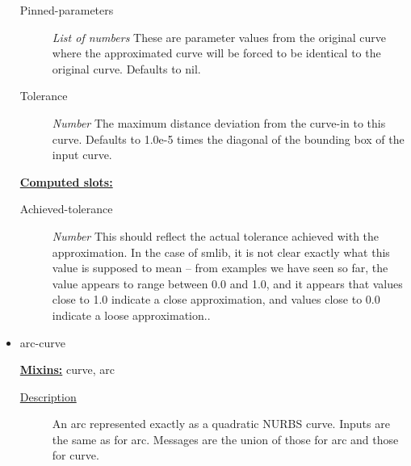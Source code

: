 \documentclass [11pt]{book}
\begin{document}
\begin{itemize}
\begin{description}
\item [Pinned-parameters]
\emph{List of numbers} These are parameter values from the original curve
where the approximated curve will be forced to be identical to the original
curve. Defaults to nil.


\item [Tolerance]
\emph{Number} The maximum distance deviation from the curve-in to this curve.
Defaults to 1.0e-5 times the diagonal of the bounding box of the input curve.


\end{description}






\textbf{
\underline{Computed slots:}}

\begin{description}

\item [Achieved-tolerance]
\emph{Number} This should reflect the actual tolerance achieved with the approximation.
In the case of smlib, it is not clear exactly what this value is supposed to mean --
from examples we have seen so far, the value appears to range between 0.0 and 1.0, and
it appears that values close to 1.0 indicate a close approximation, and values
close to 0.0 indicate a loose approximation..


\end{description}







\item {}arc-curve


\textbf{
\underline{Mixins:}} curve, arc





\begin{description}

\item [
\underline{Description}]


An arc represented exactly as a quadratic NURBS curve. Inputs are the same as for arc. 
Messages are the union of those for arc and those for curve.



\end{description}





\end{itemize}
\end{document}
